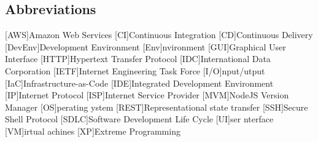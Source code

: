 \newcommand{\abbr}{Abbreviations}
\subsection{Abbreviations}

\begin{acronym}[1234567890]		%
\setlength{\itemsep}{-\parsep}	%
[AWS]{Amazon Web Services}
[CI]{Continuous Integration}
[CD]{Continuous Delivery}
[DevEnv]{Development Environment}
[Env]{nvironment}
[GUI]{Graphical User Interface}
[HTTP]{Hypertext Transfer Protocol}
[IDC]{International Data Corporation}
[IETF]{Internet Engineering Task Force}
[I/O]{nput/utput}
[IaC]{Infrastructure-as-Code}
[IDE]{Integrated Development Environment }
[IP]{Internet Protocol}
[ISP]{Internet Service Provider}
[MVM]{NodeJS Version Manager}
[OS]{perating ystem}
[REST]{Representational state transfer}
[SSH]{Secure Shell Protocol}
[SDLC]{Software Development Life Cycle}
[UI]{ser nterface}
[VM]{irtual achines}
[XP]{Extreme Programming}
\end{acronym}